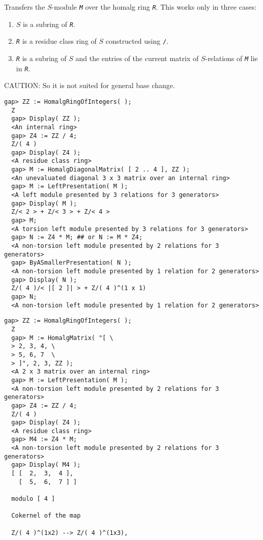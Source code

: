 \documentclass[a4paper,11pt]{report}
\begin{document}
{{{ Transfers the $S$-module \mbox{\texttt{\slshape M}} over the \textsf{homalg} ring \mbox{\texttt{\slshape R}}. This works only in three cases: 
\begin{enumerate}
\item $S$ is a subring of \mbox{\texttt{\slshape R}}.
\item \mbox{\texttt{\slshape R}} is a residue class ring of $S$ constructed using \texttt{/}.
\item \mbox{\texttt{\slshape R}} is a subring of $S$ and the entries of the current matrix of $S$-relations of \mbox{\texttt{\slshape M}} lie in \mbox{\texttt{\slshape R}}.
\end{enumerate}
 CAUTION: So it is not suited for general base change. 
\begin{Verbatim}[fontsize=\small,frame=single,label=Example]
  gap> ZZ := HomalgRingOfIntegers( );
  Z
  gap> Display( ZZ );
  <An internal ring>
  gap> Z4 := ZZ / 4;
  Z/( 4 )
  gap> Display( Z4 );
  <A residue class ring>
  gap> M := HomalgDiagonalMatrix( [ 2 .. 4 ], ZZ );
  <An unevaluated diagonal 3 x 3 matrix over an internal ring>
  gap> M := LeftPresentation( M );
  <A left module presented by 3 relations for 3 generators>
  gap> Display( M );
  Z/< 2 > + Z/< 3 > + Z/< 4 >
  gap> M;
  <A torsion left module presented by 3 relations for 3 generators>
  gap> N := Z4 * M; ## or N := M * Z4;
  <A non-torsion left module presented by 2 relations for 3 generators>
  gap> ByASmallerPresentation( N );
  <A non-torsion left module presented by 1 relation for 2 generators>
  gap> Display( N );
  Z/( 4 )/< |[ 2 ]| > + Z/( 4 )^(1 x 1)
  gap> N;
  <A non-torsion left module presented by 1 relation for 2 generators>
\end{Verbatim}
 
\begin{Verbatim}[fontsize=\small,frame=single,label=Example]
  gap> ZZ := HomalgRingOfIntegers( );
  Z
  gap> M := HomalgMatrix( "[ \
  > 2, 3, 4, \
  > 5, 6, 7  \
  > ]", 2, 3, ZZ );
  <A 2 x 3 matrix over an internal ring>
  gap> M := LeftPresentation( M );
  <A non-torsion left module presented by 2 relations for 3 generators>
  gap> Z4 := ZZ / 4;
  Z/( 4 )
  gap> Display( Z4 );
  <A residue class ring>
  gap> M4 := Z4 * M;
  <A non-torsion left module presented by 2 relations for 3 generators>
  gap> Display( M4 );
  [ [  2,  3,  4 ],
    [  5,  6,  7 ] ]
  
  modulo [ 4 ]
  
  Cokernel of the map
  
  Z/( 4 )^(1x2) --> Z/( 4 )^(1x3),
  

\end{Verbatim}}}}
\end{document}
